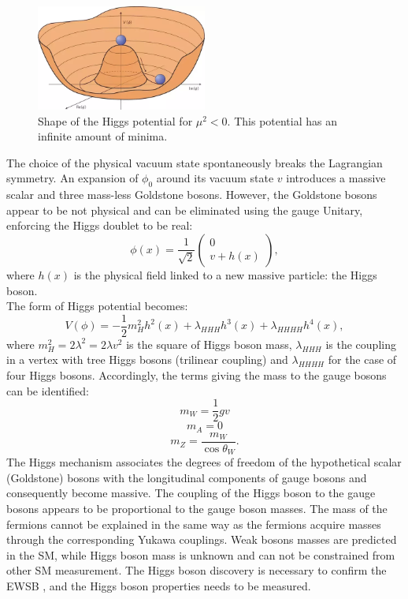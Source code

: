 \begin{figure}[htbp]
    \centering
    \includegraphics[width=0.5\textwidth]{Ch1/Img/Higgs_potential.png}
    \caption{Shape of the Higgs potential for $\mu^{2} < 0$. This potential has an infinite amount of minima. \cite{HiggsPotential}}
    \label{fig:chap1:Higggs_potential}
\end{figure}

The choice of the physical vacuum state spontaneously breaks the Lagrangian symmetry. An expansion of $\phi_0$ around its vacuum state $v$ introduces a massive scalar and three mass-less Goldstone bosons. However, the Goldstone bosons appear to be not physical and can be eliminated using the gauge Unitary, enforcing the Higgs doublet to be real:
\begin{equation}
    \phi(x)=\frac{1}{\sqrt{2}}\left(\begin{array}{c}
0 \\
v+h(x)
\end{array}\right),
\end{equation}
where $h(x)$ is the physical field linked to a new massive particle: the Higgs boson. \\
The form of Higgs potential becomes: 
\begin{equation}
    V(\phi)=-\frac{1}{2} m_{H}^{2} h^{2}(x)+\lambda_{H H H} h^{3}(x)+\lambda_{H H H H} h^{4}(x),
\end{equation}
where $m_{H}^{2}=2 \lambda^{2}=2 \lambda v^{2}$ is the square of Higgs boson mass, $\lambda_{HHH}$ is the coupling in a vertex with tree Higgs bosons (trilinear coupling) and $\lambda_{HHHH}$ for the case of four Higgs bosons.
Accordingly, the terms giving the mass to the gauge bosons can be identified:
\begin{equation}
m_{W} = \frac{1}{2}gv 
\end{equation}
\begin{equation}
m_{A} = 0    
\end{equation}
\begin{equation}
m_{Z} = \frac{m_{W}}{\cos\theta_{W}}.
\end{equation}
The Higgs mechanism associates the degrees of freedom of the hypothetical scalar (Goldstone) bosons with the longitudinal components of gauge bosons and consequently become massive. The coupling of the Higgs boson to the gauge bosons appears to be proportional to the gauge boson masses. The mass of the fermions cannot be explained in the same way as the fermions acquire masses through the corresponding Yukawa couplings. Weak bosons masses are predicted in the SM, while Higgs boson mass is unknown and can not be constrained from other SM measurement. The Higgs boson discovery is necessary to confirm the EWSB \cite{EWSB}, and the Higgs boson properties needs to be measured.

